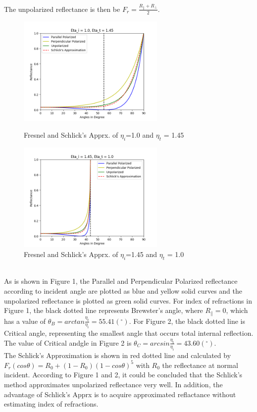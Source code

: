 \documentclass[12pt,twoside]{article}
\begin{document}
    The unpolarized reflectance is then be $F_r = \frac{R_{\parallel}+R_{\bot}}{2}$. 
\begin{figure}[htbp]
        \centering
        
        \begin{minipage}{7cm}
            \includegraphics[width = 2.8in]{./CO417_Figure/01.png} 
            \caption{Fresnel and Schlick's Apprx. of $\eta_i$=1.0 and $\eta_t$ = 1.45}
        \end{minipage}
        \begin{minipage}{7cm}
            \includegraphics[width = 2.8in]{./CO417_Figure/02.png} 
            \caption{Fresnel and Schlick's Apprx. of $\eta_i$=1.45 and $\eta_t$ = 1.0} 
        \end{minipage}
     
\end{figure}\\
As is shown in Figure 1, the Parallel and Perpendicular Polarized reflectance according to incident angle are plotted as blue and yellow solid curves and the unpolarized reflectance is plotted as green solid curves. For index of refractions in Figure 1, the black dotted line represents Brewster's angle, where $R_{\parallel}=0$, which has a value of $\theta_B = arctan\frac{\eta_t}{\eta_i} = 55.41 (^{\circ})$. For Figure 2, the black dotted line is Critical angle, representing the smallest angle that occurs total internal reflection. The value of Critical andgle in Figure 2 is $\theta_C = arcsin\frac{\eta_t}{\eta_i} = 43.60 (^{\circ})$.\\ 
The Schlick's Approximation is shown in red dotted line and calculated by $F_r(cos\theta)=R_0 + (1-R_0)(1-cos\theta)^5$ with $R_0$ the reflectance at normal incident. According to Figure 1 and 2, it could be concluded that the Schlick's method approximates unpolarized reflectance very well. In addition, the advantage of Schlick's Apprx is to acquire approximated reflactance without estimating index of refractions.
\end{document}
